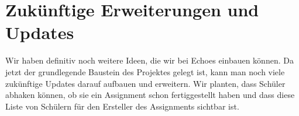\documentclass[a4paper, titlepage]{article}
\begin{document}
    \section{Zukünftige Erweiterungen und Updates}
    Wir haben definitiv noch weitere Ideen, die wir bei Echoes einbauen können. Da jetzt der grundlegende Baustein des Projektes gelegt ist, kann man noch viele zukünftige Updates darauf aufbauen und erweitern. Wir planten, dass Schüler abhaken können, ob sie ein Assignment schon fertiggestellt haben und dass diese Liste von Schülern für den Ersteller des Assignments sichtbar ist.
    


    \newpage
  
\end{document}
